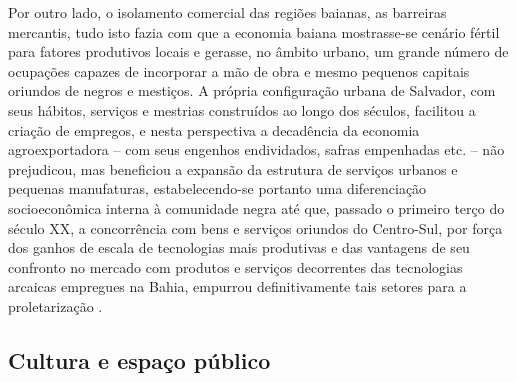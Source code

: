 Por outro lado, o isolamento comercial das regiões baianas, as barreiras mercantis, tudo isto fazia com que a economia baiana mostrasse-se cenário fértil para fatores produtivos locais e gerasse, no âmbito urbano, um grande número de ocupações capazes de incorporar a mão de obra e mesmo pequenos capitais oriundos de negros e mestiços. A própria configuração urbana de Salvador, com seus hábitos, serviços e mestrias construídos ao longo dos séculos, facilitou a criação de empregos, e nesta perspectiva a decadência da economia agroexportadora -- com seus engenhos endividados, safras empenhadas etc. -- não prejudicou, mas beneficiou a expansão da estrutura de serviços urbanos e pequenas manufaturas, estabelecendo-se portanto uma diferenciação socioeconômica interna à comunidade negra até que, passado o primeiro terço do século XX, a concorrência com bens e serviços oriundos do Centro-Sul, por força dos ganhos de escala de tecnologias mais produtivas e das vantagens de seu confronto no mercado com produtos e serviços decorrentes das tecnologias arcaicas empregues na Bahia, empurrou definitivamente tais setores para a proletarização \cite[pp.~71-72]{sodre_terreiro_1988}.

\subsection{Cultura e espaço público}\label{subsec:cultespubsaba}

